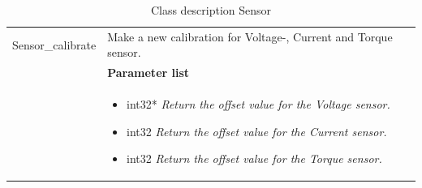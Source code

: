\begin{table}[H]
\begin{tabular}{|p{5 cm}|p{10 cm}|}
			Sensor\_calibrate
			& Make a new calibration for Voltage-, Current and Torque sensor.    
			\\ & \textbf{Parameter list}
			\\ & \begin{itemize}
				\item {\large int32*}
				\subitem \textit{Return the offset value for the Voltage sensor.}
				\item {\large int32}
				\subitem \textit{Return the offset value for the Current sensor.}
				\item {\large int32}
				\subitem \textit{Return the offset value for the Torque sensor.}
			\end{itemize}
			\\ \hline
			
		\end{tabular}
		\caption{Class description Sensor}
		\label{table:Class_description_Sensor_RR_PSoC}
		
\end{table}




